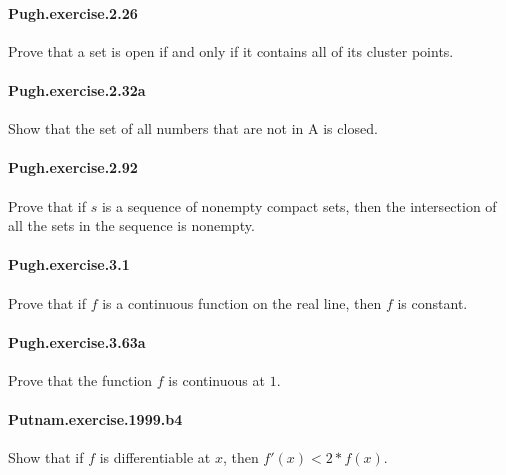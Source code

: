 \documentclass{article}
\begin{document}
\paragraph{Pugh.exercise.2.26} Prove that a set is open if and only if it contains all of its cluster points.

\paragraph{Pugh.exercise.2.32a} Show that the set of all numbers that are not in A is closed.


\paragraph{Pugh.exercise.2.92} Prove that if $s$ is a sequence of nonempty compact sets, then the intersection of all the sets in the sequence is nonempty.

\paragraph{Pugh.exercise.3.1} Prove that if $f$ is a continuous function on the real line, then $f$ is constant.

\paragraph{Pugh.exercise.3.63a} Prove that the function $f$ is continuous at $1$.


\paragraph{Putnam.exercise.1999.b4} Show that if $f$ is differentiable at $x$, then $f'(x) < 2 * f(x)$.
\end{document}
